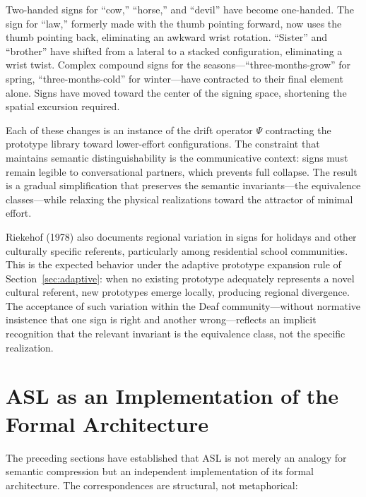 \documentclass[11pt,a4paper]{article}
\theoremstyle{definition}
\theoremstyle{remark}
\begin{document}
Two-handed signs for ``cow,'' ``horse,'' and ``devil'' have become one-handed. The sign for ``law,'' formerly made with the thumb pointing forward, now uses the thumb pointing back, eliminating an awkward wrist rotation. ``Sister'' and ``brother'' have shifted from a lateral to a stacked configuration, eliminating a wrist twist. Complex compound signs for the seasons---``three-months-grow'' for spring, ``three-months-cold'' for winter---have contracted to their final element alone. Signs have moved toward the center of the signing space, shortening the spatial excursion required.

Each of these changes is an instance of the drift operator $\Psi$ contracting the prototype library toward lower-effort configurations. The constraint that maintains semantic distinguishability is the communicative context: signs must remain legible to conversational partners, which prevents full collapse. The result is a gradual simplification that preserves the semantic invariants---the equivalence classes---while relaxing the physical realizations toward the attractor of minimal effort.

Riekehof (1978) also documents regional variation in signs for holidays and other culturally specific referents, particularly among residential school communities. This is the expected behavior under the adaptive prototype expansion rule of Section~\ref{sec:adaptive}: when no existing prototype adequately represents a novel cultural referent, new prototypes emerge locally, producing regional divergence. The acceptance of such variation within the Deaf community---without normative insistence that one sign is right and another wrong---reflects an implicit recognition that the relevant invariant is the equivalence class, not the specific realization.

\section{ASL as an Implementation of the Formal Architecture}
\label{sec:asl_synthesis}

The preceding sections have established that ASL is not merely an analogy for semantic compression but an independent implementation of its formal architecture. The correspondences are structural, not metaphorical:
\end{document}
